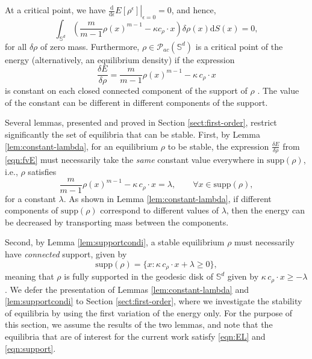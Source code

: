 \documentclass[11pt]{amsart}
\newcommand{\bbs}{\mathbb S}
\newcommand{\calP}{\mathcal{P}}
\def\d{\mathrm{d}}
\newcommand{\dx}{\mathrm{d}S (x)}
\newcommand{\supp}{\mathrm{supp}(\rho)}
\newcommand{\dm}{d} %
\begin{document}
At a critical point, we have $\left. \frac{\d}{\d \epsilon} E[\rho^\epsilon] \right|_{\epsilon=0} = 0$, and hence,
\[
\int_{\bbs^\dm}\left(\frac{m}{m-1} \rho(x)^{m-1}-\kappa  c_\rho \cdot x \right)  \delta \rho(x) \dx =0,
\]
for all $\delta \rho$ of zero mass. Furthermore, $\rho \in \calP_{ac}(\bbs^\dm)$ is a critical point of the energy (alternatively, an equilibrium density) if the expression
\begin{equation}
\label{eqn:fvE}
\frac{\delta E}{\delta \rho}= \frac{m}{m-1} \rho(x)^{m-1}-\kappa \, c_\rho \cdot x
\end{equation}
is constant on each closed connected component of the support of $\rho$ \cite{CaDePa2019, Kaib17}. The value of the constant can be different in different components of the support. 

Several lemmas, presented and proved in Section \ref{sect:first-order}, restrict significantly the set of equilibria that can be stable. First, by Lemma \ref{lem:constant-lambda}, for an equilibrium $\rho$ to be stable, the expression $\frac{\delta E}{\delta \rho}$ from \eqref{eqn:fvE} must necessarily take the {\em same} constant value everywhere in $\mathrm{supp}(\rho)$, i.e., $\rho$ satisfies
\begin{equation}
\label{eqn:EL}
\frac{m}{m-1} \rho(x)^{m-1}-\kappa \, c_\rho \cdot x = \lambda, \qquad \forall x\in \mathrm{supp}(\rho),
\end{equation} 
for a constant $\lambda$. As shown in Lemma \ref{lem:constant-lambda}, if different components of $\supp$ correspond to different values of $\lambda$, then the energy can be decreased by transporting mass between the components. 

Second, by Lemma \ref{lem:supportcondi}, a stable equilibrium $\rho$ must necessarily have {\em connected} support, given by
\begin{equation}
\label{eqn:support}
\mathrm{supp}(\rho)=\{x:\kappa\, c_\rho \cdot x+\lambda\geq0\},
\end{equation}
meaning that $\rho$ is fully supported in the geodesic disk of $\bbs^\dm$ given by $\kappa \, c_\rho \cdot x \geq -\lambda$. We defer the presentation of Lemmas \ref{lem:constant-lambda} and \ref{lem:supportcondi} to Section \ref{sect:first-order}, where we investigate the stability of equilibria by using the first variation of the energy only. For the purpose of this section, we assume the results of the two lemmas, and note that the equilibria that are of interest for the current work satisfy \eqref{eqn:EL} and \eqref{eqn:support}.
\end{document}
